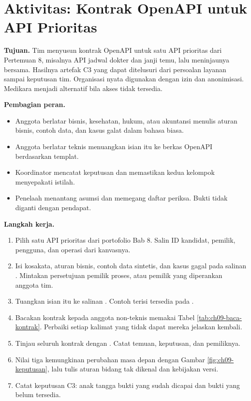 \section{Aktivitas: Kontrak OpenAPI untuk API Prioritas}

\textbf{Tujuan.} Tim menyusun kontrak OpenAPI untuk satu API prioritas dari Pertemuan 8, misalnya API jadwal dokter dan janji temu, lalu meninjaunya bersama. Hasilnya artefak C3 yang dapat ditelusuri dari persoalan layanan sampai keputusan tim. Organisasi nyata digunakan dengan izin dan anonimisasi. Medikara menjadi alternatif bila
akses tidak tersedia.

\textbf{Pembagian peran.}
\begin{itemize}
  \item Anggota berlatar bisnis, kesehatan, hukum, atau akuntansi menulis aturan bisnis, contoh data, dan kasus galat dalam bahasa biasa.
  \item Anggota berlatar teknis menuangkan isian itu ke berkas OpenAPI berdasarkan templat.
  \item Koordinator mencatat keputusan dan memastikan kedua kelompok menyepakati istilah.
  \item Penelaah menantang asumsi dan memegang daftar periksa. Bukti tidak diganti dengan pendapat.
\end{itemize}

\textbf{Langkah kerja.}
\begin{enumerate}
  \item Pilih satu API prioritas dari portofolio Bab 8. Salin ID kandidat, pemilik, pengguna, dan operasi dari kanvasnya.
  \item Isi kosakata, aturan bisnis, contoh data sintetis, dan kasus gagal pada salinan . Mintakan persetujuan pemilik proses, atau pemilik yang diperankan anggota tim.
  \item Tuangkan isian itu ke salinan . Contoh terisi tersedia pada .
  \item Bacakan kontrak kepada anggota non-teknis memakai Tabel \ref{tab:ch09-baca-kontrak}. Perbaiki setiap kalimat yang tidak dapat mereka jelaskan kembali.
  \item Tinjau seluruh kontrak dengan . Catat temuan, keputusan, dan pemiliknya.
  \item Nilai tiga kemungkinan perubahan masa depan dengan Gambar \ref{fig:ch09-keputusan}, lalu tulis aturan bidang tak dikenal dan kebijakan versi.
  \item Catat keputusan C3: anak tangga bukti yang sudah dicapai dan bukti yang belum tersedia.
\end{enumerate}

